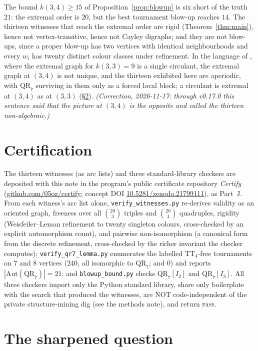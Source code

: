 \documentclass[11pt]{amsart}
\newcommand{\TT}[1]{\mathrm{TT}_{#1}}
\newcommand{\I}[1]{I_{#1}}
\newcommand{\QR}{\mathrm{QR}_7}
\newcommand{\Aut}{\mathrm{Aut}}
\theoremstyle{plain}
\theoremstyle{definition}
\theoremstyle{remark}
\begin{document}
The bound $k(3,4)\ge 15$ of Proposition~\ref{prop:blowup} is six short of
the truth $21$: the extremal order is $20$, but the best tournament
blow-up reaches $14$. The thirteen witnesses that reach the extremal
order are rigid (Theorem~\ref{thm:main}), hence not vertex-transitive,
hence not Cayley digraphs; and they are not blow-ups, since a proper
blow-up has two vertices with identical neighbourhoods and every $w_i$
has twenty distinct colour classes under refinement. In the language of
\cite[\S8.1]{PartG}, where the extremal graph for $k(3,3)=9$ is a single
circulant, the extremal graph at $(3,4)$ is not unique, and the thirteen
exhibited here are aperiodic, with $\QR$ surviving in them only as a
forced local block; a circulant is extremal at $(3,4)$ as at $(3,3)$
(\S\ref{sec:open}). \emph{(Correction, 2026-11-17: through v0.17.0 this
sentence said that the picture at $(3,4)$ is the opposite and called the
thirteen non-algebraic.)}

\section{Certification}\label{sec:cert}

The thirteen witnesses (as arc lists) and three standard-library checkers
are deposited with this note in the program's public certificate
repository \emph{Certify}
(\href{https://github.com/05oz/certify}{github.com/05oz/certify};
concept DOI \href{https://doi.org/10.5281/zenodo.21799111}{10.5281/zenodo.21799111}),
as Part~J. From each witness's arc list alone, \texttt{verify\_witnesses.py}
re-derives validity as an oriented graph, freeness over all
$\binom{20}{3}$ triples and $\binom{20}{4}$ quadruples, rigidity
(Weisfeiler--Leman refinement to twenty singleton colours, cross-checked
by an explicit automorphism count), and pairwise non-isomorphism (a
canonical form from the discrete refinement, cross-checked by the
richer invariant the checker computes); \texttt{verify\_qr7\_lemma.py}
enumerates the labelled $\TT{4}$-free tournaments on $7$ and $8$ vertices
($240$, all isomorphic to $\QR$; and $0$) and reports $|\Aut(\QR)|=21$;
and \texttt{blowup\_bound.py} checks $\QR[\I{2}]$ and $\QR[\I{3}]$. All
three checkers import only the Python standard library, share only
boilerplate with the search that produced the witnesses, are NOT
code-independent of the private structure-mining dig (see the methods
note), and return \textsc{pass}.

\section{The sharpened question}\label{sec:open}
\end{document}
